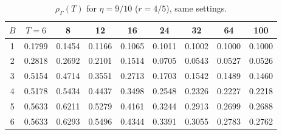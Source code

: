 \documentclass{article}
\theoremstyle{plain}
\theoremstyle{definition}
\theoremstyle{remark}
\newcommand{\rhoG}{\rho_\Gamma}
\begin{document}
\begin{table}[h]
\centering
\caption{$\rhoG(T)$ for $\eta=9/10$ ($r=4/5$), same settings.}
\small
\begin{tabular}{ccccccccc}
\toprule
$B$ & $T=6$ & 8 & 12 & 16 & 24 & 32 & 64 & 100\\
\midrule
1 & 0.1799 & 0.1454 & 0.1166 & 0.1065 & 0.1011 & 0.1002 & 0.1000 & 0.1000\\
2 & 0.2818 & 0.2692 & 0.2101 & 0.1514 & 0.0705 & 0.0543 & 0.0527 & 0.0526\\
3 & 0.5154 & 0.4714 & 0.3551 & 0.2713 & 0.1703 & 0.1542 & 0.1489 & 0.1460\\
4 & 0.5178 & 0.5434 & 0.4437 & 0.3498 & 0.2548 & 0.2326 & 0.2227 & 0.2218\\
5 & 0.5633 & 0.6211 & 0.5279 & 0.4161 & 0.3244 & 0.2913 & 0.2699 & 0.2688\\
6 & 0.5633 & 0.6293 & 0.5496 & 0.4344 & 0.3391 & 0.3055 & 0.2783 & 0.2762\\
\bottomrule
\end{tabular}
\end{table}
\FloatBarrier
\end{document}
